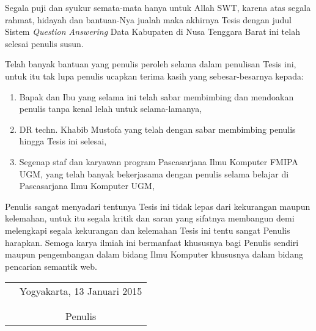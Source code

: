 \documentclass[tesis]{ugmtesis}
\begin{document}
\preface
Segala puji dan syukur semata-mata hanya untuk Allah SWT, karena atas segala
rahmat, hidayah dan bantuan-Nya jualah maka akhirnya Tesis dengan judul
Sistem \textit{Question Answering} Data Kabupaten di Nusa Tenggara Barat ini telah selesai penulis susun.

Telah banyak bantuan yang penulis peroleh selama dalam penulisan Tesis ini, untuk itu tak lupa penulis ucapkan terima kasih yang sebesar-besarnya kepada:

\begin{enumerate}
	\item{Bapak dan Ibu yang selama ini telah sabar membimbing dan mendoakan penulis tanpa kenal lelah untuk selama-lamanya,}
	\item{DR techn. Khabib Mustofa yang telah dengan sabar membimbing penulis hingga Tesis ini selesai,}
	\item{Segenap staf dan karyawan program Pascasarjana Ilmu Komputer FMIPA UGM, yang telah banyak bekerjasama dengan penulis selama belajar di Pascasarjana Ilmu Komputer UGM,}
\end{enumerate}

Penulis sangat menyadari tentunya Tesis ini tidak lepas dari kekurangan maupun kelemahan, untuk itu segala kritik dan saran yang sifatnya membangun demi melengkapi segala kekurangan dan kelemahan Tesis ini tentu sangat Penulis harapkan. Semoga karya ilmiah ini bermanfaat khususnya bagi Penulis sendiri maupun pengembangan dalam bidang Ilmu Komputer khususnya 
dalam bidang pencarian semantik web.

\begin{tabular}{p{7.5cm}c}
&Yogyakarta, 13 Januari 2015\\
&\\
&\\
&Penulis
\end{tabular}

\tableofcontents
\listoftables
\listoffigures


\end{document}

